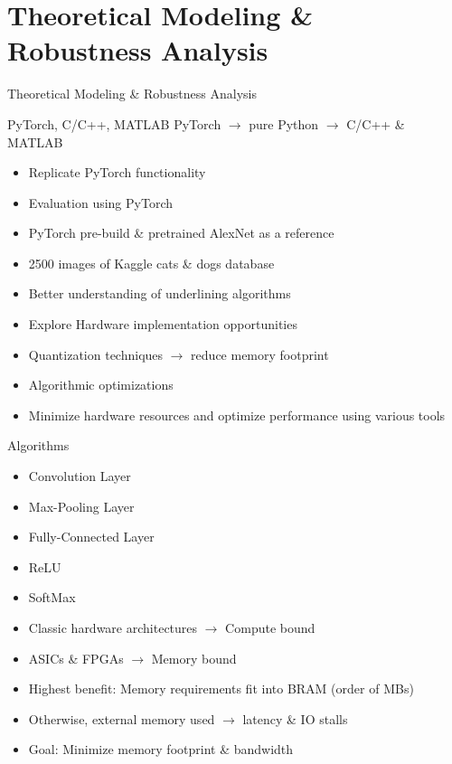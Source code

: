 \setlength{\parskip}{\baselineskip}
\section[Theoretical Modeling]{Theoretical Modeling \& Robustness Analysis}

\begin{frame}
	\huge Theoretical Modeling \& Robustness Analysis
\end{frame}

\begin{frame}{PyTorch, C/C++, MATLAB}
	PyTorch $\rightarrow$ pure Python $\rightarrow$ C/C++ \& MATLAB
	\begin{itemize}
		\item Replicate PyTorch functionality
		\item Evaluation using PyTorch
		\item PyTorch pre-build \& pretrained AlexNet as a reference
		\item 2500 images of Kaggle cats \& dogs database
		\item Better understanding of underlining algorithms
		\item Explore Hardware implementation opportunities
		\item Quantization techniques $\rightarrow$ reduce memory footprint
		\item Algorithmic optimizations
		\item Minimize hardware resources and optimize performance using various tools
	\end{itemize}
\end{frame}

\begin{frame}{Algorithms}
	\begin{itemize}
		\item Convolution Layer
		\item Max-Pooling Layer
		\item Fully-Connected Layer
		\item ReLU
		\item SoftMax
	\end{itemize}
\end{frame}

\begin{frame}
	\begin{itemize}
		\item Classic hardware architectures $\rightarrow$ Compute bound
		\item ASICs \& FPGAs $\rightarrow$ Memory bound
		\item Highest benefit: Memory requirements fit into BRAM (order of MBs)
		\item Otherwise, external memory used $\rightarrow$ latency \& IO stalls
		\item Goal: Minimize memory footprint \& bandwidth
	\end{itemize}
\end{frame}

